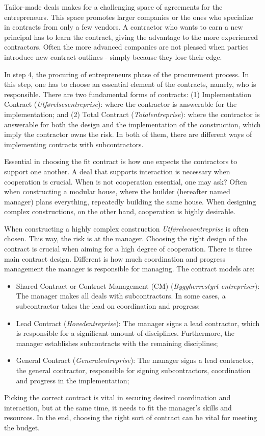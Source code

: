 Tailor-made deals makes for a challenging space of agreements for the entrepreneurs. This space promotes larger companies or the ones who specialize in contracts from only a few vendors. A contractor who wants to earn a new principal has to learn the contract, giving the advantage to the more experienced contractors. Often the more advanced companies are not pleased when parties introduce new contract outlines - simply because they lose their edge. 

In step 4, the procuring of entrepreneurs phase of the procurement process. In this step, one has to choose an essential element of the contracts, namely, who is responsible. There are two fundamental forms of contracts: (1) Implementation Contract (\textit{Utførelsesentreprise}): where the contractor is answerable for the implementation; and (2) Total Contract (\textit{Totalentreprise}): where the contractor is answerable for both the design and the implementation of the construction, which imply the contractor owns the risk. In both of them, there are different ways of implementing contracts with subcontractors. 

Essential in choosing the fit contract is how one expects the contractors to support one another. A deal that supports interaction is necessary when cooperation is crucial. When is not cooperation essential, one may ask? Often when constructing a modular house, where the builder (hereafter named manager) plans everything, repeatedly building the same house. When designing complex constructions, on the other hand, cooperation is highly desirable. 

When constructing a highly complex construction \textit{Utførelsesentreprise} is often chosen. This way, the risk is at the manager. Choosing the right design of the contract is crucial when aiming for a high degree of cooperation. There is three main contract design. Different is how much coordination and progress management the manager is responsible for managing. The contract models are: 

\begin{itemize}
    \item Shared Contract or Contract Management (CM) (\textit{Byggherrestyrt entrepriser}): The manager makes all deals with subcontractors. In some cases, a subcontractor takes the lead on coordination and progress;
    \item Lead Contract (\textit{Hovedentreprise}): The manager signs a lead contractor, which is responsible for a significant amount of disciplines. Furthermore, the manager establishes subcontracts with the remaining disciplines; 
    \item General Contract (\textit{Generalentreprise}): The manager signs a lead contractor, the general contractor, responsible for signing subcontractors, coordination and progress in the implementation;
\end{itemize}

Picking the correct contract is vital in securing desired coordination and interaction, but at the same time, it needs to fit the manager's skills and resources. In the end, choosing the right sort of contract can be vital for meeting the budget.


\cleardoublepage